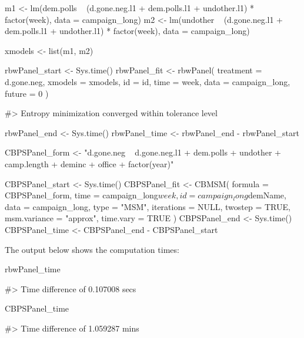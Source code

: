 \begin{Schunk}
\begin{Sinput}
m1 <-
  lm(dem.polls ~ (d.gone.neg.l1 + dem.polls.l1 + undother.l1) * factor(week),
     data = campaign_long)
m2 <-
  lm(undother ~ (d.gone.neg.l1 + dem.polls.l1 + undother.l1) * factor(week),
     data = campaign_long)

xmodels <- list(m1, m2)

rbwPanel_start <- Sys.time()
rbwPanel_fit <- rbwPanel(
  treatment = d.gone.neg,
  xmodels = xmodels,
  id = id,
  time = week,
  data = campaign_long,
  future = 0
)
\end{Sinput}
\begin{Soutput}
#> Entropy minimization converged within tolerance level
\end{Soutput}
\begin{Sinput}
rbwPanel_end <- Sys.time()
rbwPanel_time <- rbwPanel_end - rbwPanel_start
\end{Sinput}
\end{Schunk}

\begin{Schunk}
\begin{Sinput}
CBPSPanel_form <-
  "d.gone.neg ~ d.gone.neg.l1 + dem.polls + undother + camp.length + deminc + office + factor(year)"

CBPSPanel_start <- Sys.time()
CBPSPanel_fit <-
  CBMSM(
    formula = CBPSPanel_form,
    time = campaign_long$week,
    id = campaign_long$demName,
    data = campaign_long,
    type = "MSM",
    iterations = NULL,
    twostep = TRUE,
    msm.variance = "approx",
    time.vary = TRUE
  )
CBPSPanel_end <- Sys.time()
CBPSPanel_time <- CBPSPanel_end - CBPSPanel_start
\end{Sinput}
\end{Schunk}

The output below shows the computation times:

\begin{Schunk}
\begin{Sinput}
rbwPanel_time
\end{Sinput}
\begin{Soutput}
#> Time difference of 0.107008 secs
\end{Soutput}
\begin{Sinput}
CBPSPanel_time
\end{Sinput}
\begin{Soutput}
#> Time difference of 1.059287 mins
\end{Soutput}
\end{Schunk}


